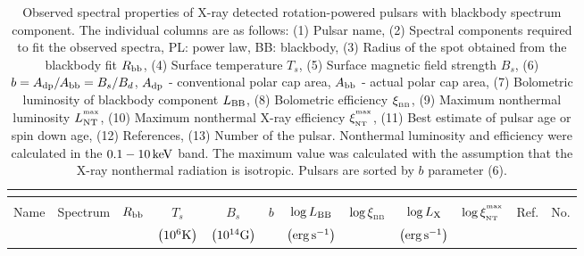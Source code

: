 
\begin{table*}
    \caption[Observed spectral properties of X-ray detected rotation-powered
    pulsars with blackbody spectrum component]{Observed spectral properties of
    X-ray detected rotation-powered
    pulsars with blackbody spectrum component. The individual columns are
    as follows: (1) Pulsar name, (2) Spectral components required to fit the
    observed
    spectra, PL: power law, BB: blackbody, (3) Radius of the spot obtained
    from the blackbody fit $R_{\rm bb}$, (4) Surface temperature $T_s$,
    (5) Surface magnetic field strength $B_s$,
    (6) $b = A_{\rm dp} / A_{\rm bb} = B_s / B_d$, $A_{\rm dp}$ - conventional
    polar
    cap area, $A_{\rm bb}$ - actual polar cap area, (7) Bolometric luminosity
    of blackbody component $L_{\rm BB}$, (8) Bolometric efficiency
    $\xi_{_{\rm BB}}$,
    (9) Maximum nonthermal luminosity $L_{\rm NT}^{^{\rm max}}$,
    (10) Maximum nonthermal X-ray efficiency $\xi_{_{\rm NT}}^{^{\rm max}}$,
    (11) Best estimate of pulsar age or spin down age,
    (12) References, (13) Number of the pulsar.
    Nonthermal luminosity and efficiency were calculated in the $0.1 -10 \,
    {\rm keV}$ band.
    The maximum value was calculated with the assumption that the X-ray
    nonthermal radiation is isotropic.
    Pulsars are sorted by $b$ parameter (6).
        \label{tab:x-ray_thermal}
    }
    \begin{center}
    \begin{tabular}{|l|c|c|c|c|c|c|c|c|c|c|c|}
        \multicolumn{12}{c}{} \\
        \hline
        & & & & & & & & & & & \\
        Name   &   Spectrum   &   $R_{\rm bb}$   &   $T_s$   &   $B_s$   &
            $b$   &   $\log L_{\rm BB}$   &   $\log \xi_{_{\rm BB}}$   &
            $\log L_{\rm X}$   &   $\log \xi_{_{\rm NT}}^{^{\rm max}}$   &
            Ref.   &   No.   \\
        &   &   &   {\scriptsize $\left ( 10^{6}{\rm K} \right )$}   &
            {\scriptsize $\left (10^{14}{\rm G} \right )$}   &   &
            {\scriptsize $\left ( {\rm erg \, s^{-1}} \right )$}   &    &
            {\scriptsize $\left ( {\rm erg \, s^{-1}} \right )$}   &    &  & \\
        \hline
        \hline
             

\end{tabular}
\end{center}
\end{table*}
